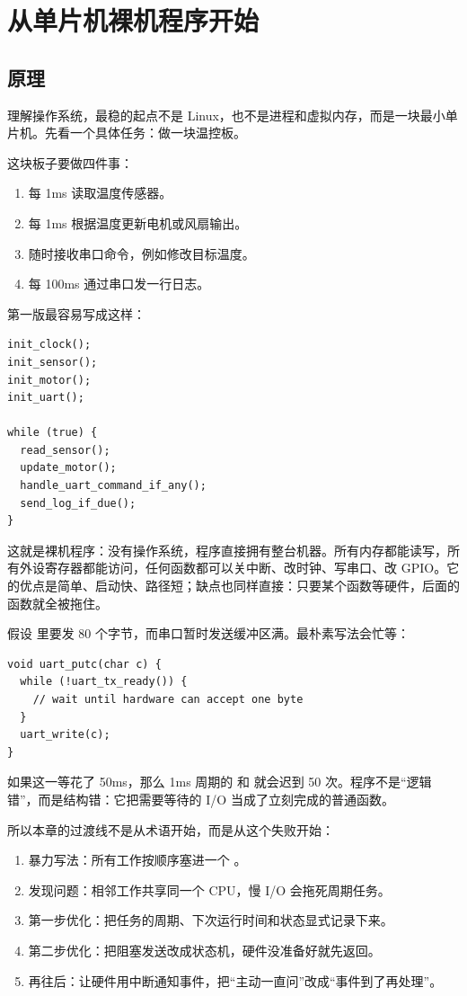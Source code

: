 \chapter{从单片机裸机程序开始}

\section{原理}

理解操作系统，最稳的起点不是 Linux，也不是进程和虚拟内存，而是一块最小单片机。先看一个具体任务：做一块温控板。

这块板子要做四件事：

\begin{enumerate}
\tightlist
\item 每 1ms 读取温度传感器。
\item 每 1ms 根据温度更新电机或风扇输出。
\item 随时接收串口命令，例如修改目标温度。
\item 每 100ms 通过串口发一行日志。
\end{enumerate}

第一版最容易写成这样：

\begin{lstlisting}
init_clock();
init_sensor();
init_motor();
init_uart();

while (true) {
  read_sensor();
  update_motor();
  handle_uart_command_if_any();
  send_log_if_due();
}
\end{lstlisting}

这就是裸机程序：没有操作系统，程序直接拥有整台机器。所有内存都能读写，所有外设寄存器都能访问，任何函数都可以关中断、改时钟、写串口、改 GPIO。它的优点是简单、启动快、路径短；缺点也同样直接：只要某个函数等硬件，后面的函数就全被拖住。

假设  里要发 80 个字节，而串口暂时发送缓冲区满。最朴素写法会忙等：

\begin{lstlisting}
void uart_putc(char c) {
  while (!uart_tx_ready()) {
    // wait until hardware can accept one byte
  }
  uart_write(c);
}
\end{lstlisting}

如果这一等花了 50ms，那么 1ms 周期的  和  就会迟到 50 次。程序不是“逻辑错”，而是结构错：它把需要等待的 I/O 当成了立刻完成的普通函数。

所以本章的过渡线不是从术语开始，而是从这个失败开始：

\begin{enumerate}
\tightlist
\item 暴力写法：所有工作按顺序塞进一个 。
\item 发现问题：相邻工作共享同一个 CPU，慢 I/O 会拖死周期任务。
\item 第一步优化：把任务的周期、下次运行时间和状态显式记录下来。
\item 第二步优化：把阻塞发送改成状态机，硬件没准备好就先返回。
\item 再往后：让硬件用中断通知事件，把“主动一直问”改成“事件到了再处理”。
\end{enumerate}

